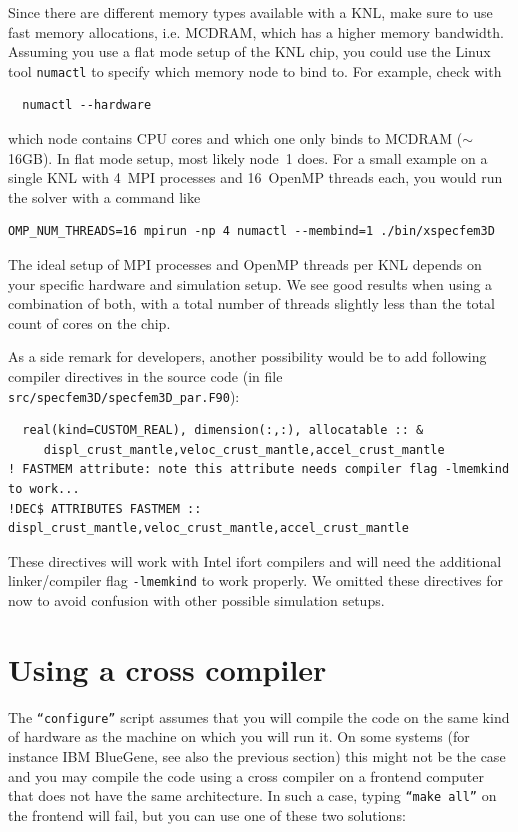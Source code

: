 Since there are different memory types available with a KNL, make sure to use fast memory allocations, i.e. MCDRAM, which has a higher memory bandwidth.
Assuming you use a flat mode setup of the KNL chip, you could use the Linux tool \texttt{numactl} to specify which memory node to bind to.
For example, check with
{\small
\begin{verbatim}
  numactl --hardware
\end{verbatim}
}
\noindent
which node contains CPU cores and which one only binds to MCDRAM ($\sim$16GB). In flat mode setup, most likely node~1 does.
For a small example on a single KNL with 4~MPI processes and 16~OpenMP threads each, you would run the solver with a command like
{\small
\begin{verbatim}
OMP_NUM_THREADS=16 mpirun -np 4 numactl --membind=1 ./bin/xspecfem3D
\end{verbatim}
}
\noindent
The ideal setup of MPI processes and OpenMP threads per KNL depends on your specific hardware and simulation setup. We see good results when using a combination of both, with a total number of threads slightly less than the total count of cores on the chip.


As a side remark for developers, another possibility would be to add following compiler directives in the source code
(in file \texttt{src/specfem3D/specfem3D\_par.F90}):
{\small
\begin{verbatim}
  real(kind=CUSTOM_REAL), dimension(:,:), allocatable :: &
     displ_crust_mantle,veloc_crust_mantle,accel_crust_mantle
! FASTMEM attribute: note this attribute needs compiler flag -lmemkind to work...
!DEC$ ATTRIBUTES FASTMEM :: displ_crust_mantle,veloc_crust_mantle,accel_crust_mantle
\end{verbatim}
}
\noindent
These directives will work with Intel ifort compilers and will need the additional linker/compiler flag \texttt{-lmemkind} to work properly.
We omitted these directives for now to avoid confusion with other possible simulation setups.


\section{Using a cross compiler}

\noindent
The \texttt{``configure''} script assumes that you will compile the code on the same kind of hardware
as the machine on which you will run it. On some systems (for instance IBM BlueGene, see also the previous section) this might not be the case
and you may compile the code using a cross compiler on a frontend computer that does not have the same
architecture. In such a case, typing \texttt{``make all''} on the frontend will fail, but you can use one of these two solutions: \newline

